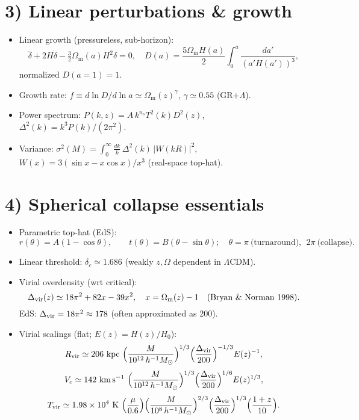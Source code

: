 \documentclass[11pt,a4paper]{article}
\newcommand{\Hnot}{H_0}
\newcommand{\hubble}{h}
\newcommand{\Omm}{\Omega_{\mathrm m}}
\newcommand{\ns}{n_s}
\begin{document}
\section*{3) Linear perturbations \& growth}
\begin{itemize}
\item Linear growth (pressureless, sub-horizon):
\[
\ddot\delta+2H\dot\delta-\tfrac{3}{2}\Omm(a)H^2\delta=0,\quad
D(a)=\frac{5\Omm H(a)}{2}\int_0^{a}\frac{da'}{(a'H(a'))^3},
\]
normalized $D(a{=}1)=1$.
\item Growth rate: $f\equiv d\ln D/d\ln a\simeq \Omm(z)^\gamma$, $\gamma\simeq 0.55$ (GR+$\Lambda$).
\item Power spectrum: $P(k,z)=A\,k^{\ns}T^2(k)D^2(z)$,\quad
$\Delta^2(k)=k^3P(k)/(2\pi^2)$.
\item Variance: $\sigma^2(M)=\int_0^\infty \frac{dk}{k}\,\Delta^2(k)\,|W(kR)|^2$, 
$W(x)=3(\sin x-x\cos x)/x^3$ (real-space top-hat).
\end{itemize}

\section*{4) Spherical collapse essentials}
\begin{itemize}
\item Parametric top-hat (EdS):
\[
r(\theta)=A(1-\cos\theta),\qquad t(\theta)=B(\theta-\sin\theta);\quad
\theta=\pi\ \text{(turnaround)},\ \ 2\pi\ \text{(collapse)}.
\]
\item Linear threshold: $\delta_c\simeq 1.686$ (weakly $z,\Omega$ dependent in $\Lambda$CDM).
\item Virial overdensity (wrt critical):
\[
\Delta_{\rm vir}(z)\simeq 18\pi^2+82x-39x^2,\quad x=\Omm(z)-1
\quad\text{(Bryan \& Norman 1998).}
\]
EdS: $\Delta_{\rm vir}=18\pi^2\approx 178$ (often approximated as 200).
\item Virial scalings (flat; $E(z)=H(z)/\Hnot$):
\[
R_{\rm vir}\simeq 206\ \mathrm{kpc}\ 
\Big(\frac{M}{10^{12}\,\hubble^{-1}M_\odot}\Big)^{1/3}
\Big(\frac{\Delta_{\rm vir}}{200}\Big)^{-1/3}E(z)^{-1},
\]
\[
V_c\simeq 142\ \mathrm{km\,s^{-1}}\ 
\Big(\frac{M}{10^{12}\,\hubble^{-1}M_\odot}\Big)^{1/3}
\Big(\frac{\Delta_{\rm vir}}{200}\Big)^{1/6}E(z)^{1/3},
\]
\[
T_{\rm vir}\simeq 1.98\times10^4\ \mathrm{K}\ 
\Big(\frac{\mu}{0.6}\Big)
\Big(\frac{M}{10^{8}\,\hubble^{-1}M_\odot}\Big)^{2/3}
\Big(\frac{\Delta_{\rm vir}}{200}\Big)^{1/3}
\Big(\frac{1+z}{10}\Big).
\]
\end{itemize}
\end{document}
